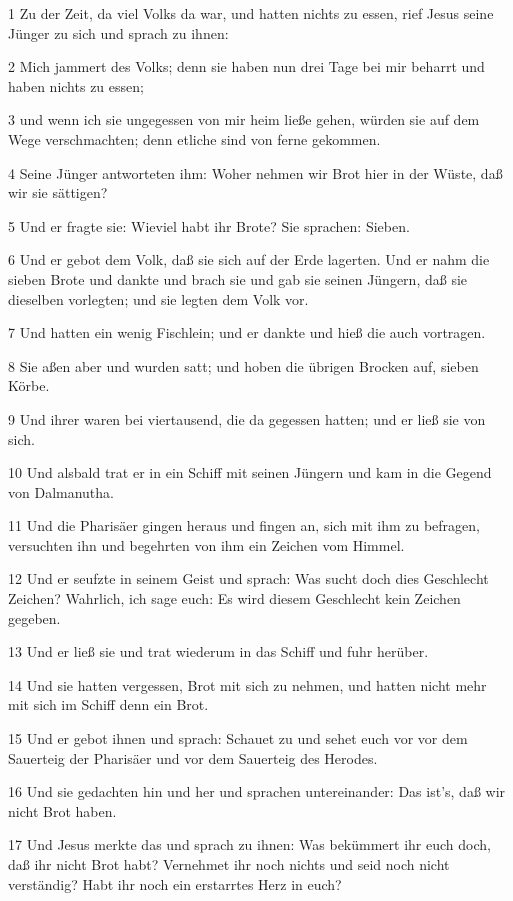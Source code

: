 \par 1 Zu der Zeit, da viel Volks da war, und hatten nichts zu essen, rief Jesus seine Jünger zu sich und sprach zu ihnen:
\par 2 Mich jammert des Volks; denn sie haben nun drei Tage bei mir beharrt und haben nichts zu essen;
\par 3 und wenn ich sie ungegessen von mir heim ließe gehen, würden sie auf dem Wege verschmachten; denn etliche sind von ferne gekommen.
\par 4 Seine Jünger antworteten ihm: Woher nehmen wir Brot hier in der Wüste, daß wir sie sättigen?
\par 5 Und er fragte sie: Wieviel habt ihr Brote? Sie sprachen: Sieben.
\par 6 Und er gebot dem Volk, daß sie sich auf der Erde lagerten. Und er nahm die sieben Brote und dankte und brach sie und gab sie seinen Jüngern, daß sie dieselben vorlegten; und sie legten dem Volk vor.
\par 7 Und hatten ein wenig Fischlein; und er dankte und hieß die auch vortragen.
\par 8 Sie aßen aber und wurden satt; und hoben die übrigen Brocken auf, sieben Körbe.
\par 9 Und ihrer waren bei viertausend, die da gegessen hatten; und er ließ sie von sich.
\par 10 Und alsbald trat er in ein Schiff mit seinen Jüngern und kam in die Gegend von Dalmanutha.
\par 11 Und die Pharisäer gingen heraus und fingen an, sich mit ihm zu befragen, versuchten ihn und begehrten von ihm ein Zeichen vom Himmel.
\par 12 Und er seufzte in seinem Geist und sprach: Was sucht doch dies Geschlecht Zeichen? Wahrlich, ich sage euch: Es wird diesem Geschlecht kein Zeichen gegeben.
\par 13 Und er ließ sie und trat wiederum in das Schiff und fuhr herüber.
\par 14 Und sie hatten vergessen, Brot mit sich zu nehmen, und hatten nicht mehr mit sich im Schiff denn ein Brot.
\par 15 Und er gebot ihnen und sprach: Schauet zu und sehet euch vor vor dem Sauerteig der Pharisäer und vor dem Sauerteig des Herodes.
\par 16 Und sie gedachten hin und her und sprachen untereinander: Das ist's, daß wir nicht Brot haben.
\par 17 Und Jesus merkte das und sprach zu ihnen: Was bekümmert ihr euch doch, daß ihr nicht Brot habt? Vernehmet ihr noch nichts und seid noch nicht verständig? Habt ihr noch ein erstarrtes Herz in euch?
